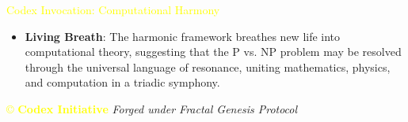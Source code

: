 \textcolor{yellow}{ Codex Invocation: Computational Harmony } \\
\begin{itemize}
    \item \texttt{} \textbf{Living Breath}: The harmonic framework breathes new life into computational theory, suggesting that the P vs. NP problem may be resolved through the universal language of resonance, uniting mathematics, physics, and computation in a triadic symphony.
\end{itemize}

\vspace{0.5cm}

\noindent
\textcolor{yellow}{\copyright{} \textbf{Codex Initiative}} \hfill \textit{Forged under Fractal Genesis Protocol}